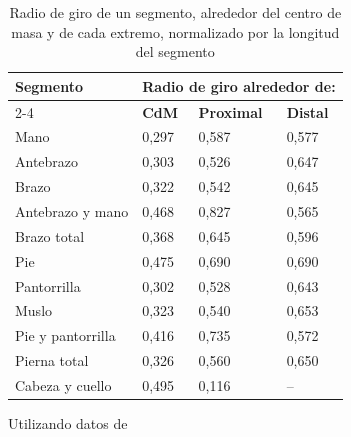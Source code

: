 \documentclass[12pt]{book}
\begin{document}
\begin{table}[htbp]
\centering
\caption{Radio de giro de un segmento, alrededor del centro de masa y de cada extremo, normalizado por la longitud del segmento}
\label{tab:19}
\begin{tabularx}{\textwidth}{lXXX}
\toprule
\textbf{Segmento} & \multicolumn{3}{c}{\textbf{Radio de giro alrededor de:}} \\
\cmidrule(lr){2-4}
 & \textbf{CdM} & \textbf{Proximal} & \textbf{Distal} \\
\midrule
Mano & 0,297 & 0,587 & 0,577 \\
Antebrazo & 0,303 & 0,526 & 0,647 \\
Brazo & 0,322 & 0,542 & 0,645 \\
Antebrazo y mano & 0,468 & 0,827 & 0,565 \\
Brazo total & 0,368 & 0,645 & 0,596 \\
Pie & 0,475 & 0,690 & 0,690 \\
Pantorrilla & 0,302 & 0,528 & 0,643 \\
Muslo & 0,323 & 0,540 & 0,653 \\
Pie y pantorrilla & 0,416 & 0,735 & 0,572 \\
Pierna total & 0,326 & 0,560 & 0,650 \\
Cabeza y cuello & 0,495 & 0,116 & -- \\
\bottomrule
\end{tabularx}
\begin{flushleft}
    \small Utilizando datos de \cite{42}
\end{flushleft}
\end{table}
\end{document}
